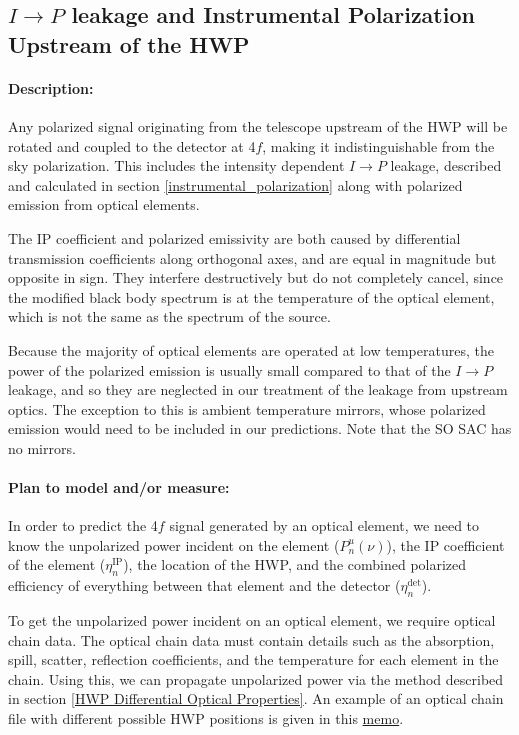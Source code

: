 
\subsection{$I\rightarrow P$ leakage and Instrumental Polarization Upstream of the HWP}
\label{IP upstream of HWP}

\paragraph{Description:}
Any polarized signal originating from the telescope upstream of the HWP will be rotated and coupled to the detector at 4$f$,
making it indistinguishable from the sky polarization.
This includes the intensity dependent $I\rightarrow P$ leakage, 
described and calculated in section \ref{instrumental_polarization} 
along with polarized emission from optical elements. 

The IP coefficient and polarized emissivity are both caused by differential transmission coefficients along orthogonal axes,
and are equal in magnitude but opposite in sign.
They interfere destructively but do not completely cancel, since the modified black body spectrum is at the temperature
of the optical element, which is not the same as the spectrum of the source.

Because the majority of optical elements are operated at low temperatures, 
the power of the polarized emission is usually small compared to that of the $I\rightarrow P$ leakage, and so they are neglected in our treatment of the leakage from upstream optics.
The exception to this is ambient temperature mirrors, whose polarized emission would need to be included in our predictions. Note that the SO SAC has no mirrors.

\paragraph{Plan to model and/or measure:}
In order to predict the 4$f$ signal generated by an optical element, 
we need to know the unpolarized power incident on the element ($P^u_n(\nu)$), the IP coefficient of the element 
($\eta_n^\text{IP}$), the location of the HWP,
and the combined polarized efficiency of everything between that element and the detector ($\eta_n^\text{det}$).

To get the unpolarized power incident on an optical element, we require optical chain data.
The optical chain data must contain details such as the absorption, spill, scatter, reflection coefficients, and 
the temperature for each element in the chain.
Using this, we can propagate unpolarized power via the method described in section \ref{HWP Differential Optical Properties}. 
An example of an optical chain file with different possible HWP positions is given in this 
\href{http://simonsobservatory.wdfiles.com/local--files/calandsys-telecon/eb_leakage_from_pointing_error.pdf?ukey=61f26ef33e8439a4e7096ab52c54c523066a4e35}{memo}.


